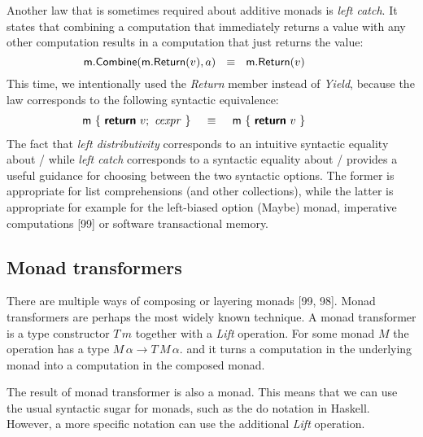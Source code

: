 \documentclass[runningheads,a4paper]{llncs}
\begin{document}
Another law that is sometimes required about additive monads is \emph{left catch}. It states that
combining a computation that immediately returns a value with any other computation results in 
a computation that just returns the value:
%
\begin{equation*}
\hspace{-3em}
\ident{m}.\ident{Combine}(\ident{m}.\ident{Return}(v), a)
~~\equiv~~
\ident{m}.\ident{Return}(v)
\end{equation*}
%
This time, we intentionally used the \emph{Return} member instead of \emph{Yield}, because the law
corresponds to the following syntactic equivalence:
%
\begin{equation*}
\hspace{-3em}
\begin{array}{l}
\ident{m}~\{~  \kvd{return}~v; ~ \cexpr~\}
\end{array}~~\equiv~~
\begin{array}{l}
\ident{m}~\{~  \kvd{return}~v~\}\\
\end{array}
\end{equation*}
%
The fact that \emph{left distributivity} corresponds to an intuitive syntactic equality
about / while \emph{left catch} corresponds to a syntactic equality
about / provides a useful guidance for choosing between the two
syntactic options. The former is appropriate for list comprehensions (and other collections), 
while the latter is appropriate for example for the left-biased option (Maybe) monad, imperative 
computations [99] or software transactional memory.

\subsection{Monad transformers}
\label{sec:laws-transf}

There are multiple ways of composing or layering monads [99, 98]. Monad transformers are perhaps 
the most widely known technique. A monad transformer is a type constructor $T\,m$ together with
a \emph{Lift} operation. For some monad $M$ the operation has a type $M\,\alpha \rightarrow T\,M\,\alpha$.
and it turns a computation in the underlying monad into a computation in the composed monad.

The result of monad transformer is also a monad. This means that we can use the usual syntactic 
sugar for monads, such as the do notation in Haskell. However, a more specific notation can
use the additional \emph{Lift} operation.
\end{document}
